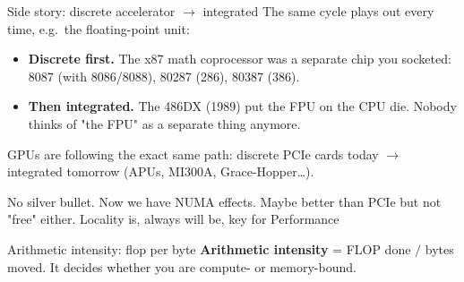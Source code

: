\begin{frame}{Side story: discrete accelerator $\rightarrow$ integrated}
The same cycle plays out every time, e.g.\ the floating-point unit:
\begin{itemize}
    \item \textbf{Discrete first.} The x87 math coprocessor was a separate chip
          you socketed: 8087 (with 8086/8088), 80287 (286), 80387 (386).
    \item \textbf{Then integrated.} The 486DX (1989) put the FPU on the CPU die.
          Nobody thinks of "the FPU" as a separate thing anymore.
\end{itemize}
\alert{GPUs are following the exact same path}: discrete PCIe cards today
$\rightarrow$ integrated tomorrow (APUs, MI300A, Grace-Hopper\ldots).

No silver bullet. Now we have NUMA effects. Maybe better than PCIe but not "free" either.
Locality is, always will be, key for Performance
\end{frame}


\begin{frame}{Arithmetic intensity: flop per byte}
\textbf{Arithmetic intensity} = FLOP done $/$ bytes moved. It decides whether you
are compute- or memory-bound. 

\end{frame}

